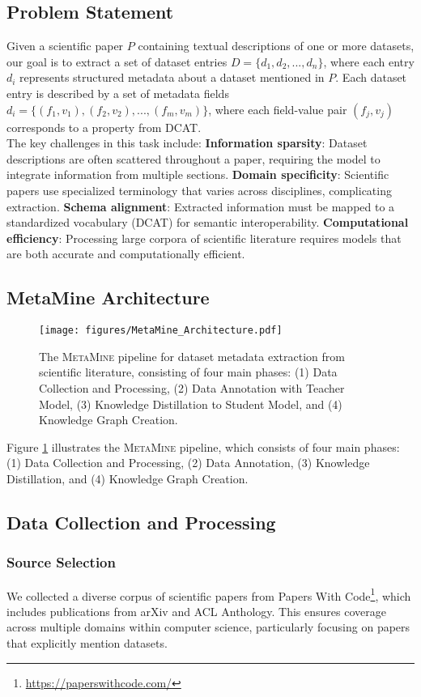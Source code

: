 \documentclass[runningheads]{llncs}
\begin{document}
\subsection{Problem Statement}
Given a scientific paper \(P\) containing textual descriptions of one or more datasets, our goal is to extract a set of dataset entries \(D = \{d_1, d_2, ..., d_n\}\), where each entry \(d_i\) represents structured metadata about a dataset mentioned in \(P\). Each dataset entry is described by a set of metadata fields \(d_i = \{(f_1, v_1), (f_2, v_2), ..., (f_m, v_m)\}\), where each field-value pair \((f_j, v_j)\) corresponds to a property from DCAT.
\\
\noindent
The key challenges in this task include: \textbf{Information sparsity}: Dataset descriptions are often scattered throughout a paper, requiring the model to integrate information from multiple sections. \textbf{Domain specificity}: Scientific papers use specialized terminology that varies across disciplines, complicating extraction. \textbf{Schema alignment}: Extracted information must be mapped to a standardized vocabulary (DCAT) for semantic interoperability. \textbf{Computational efficiency}: Processing large corpora of scientific literature requires models that are both accurate and computationally efficient.

\subsection{MetaMine Architecture}
\begin{figure}[t!]
\centering
\texttt{[image: figures/MetaMine\_Architecture.pdf]}
\caption{The \textsc{MetaMine} pipeline for dataset metadata extraction from scientific literature, consisting of four main phases: (1) Data Collection and Processing, (2) Data Annotation with Teacher Model, (3) Knowledge Distillation to Student Model, and (4) Knowledge Graph Creation.}
\label{fig:architecture}
\end{figure}
\noindent
Figure \ref{fig:architecture} illustrates the \textsc{MetaMine} pipeline, which consists of four main phases: (1) Data Collection and Processing, (2) Data Annotation, (3) Knowledge Distillation, and (4) Knowledge Graph Creation. 

\subsection{Data Collection and Processing}
\subsubsection{Source Selection}
We collected a diverse corpus of scientific papers from Papers With Code\footnote{\url{https://paperswithcode.com/}}, which includes publications from arXiv and ACL Anthology. This ensures coverage across multiple domains within computer science, particularly focusing on papers that explicitly mention datasets.
\end{document}
